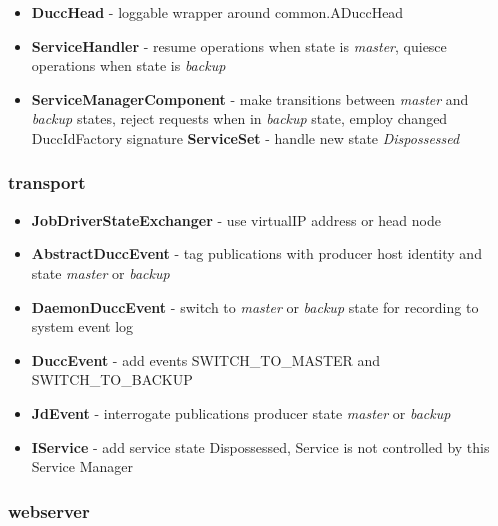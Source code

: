 \documentclass[letterpaper]{article}
\begin{document}
{\renewcommand\labelitemi{}
\begin{itemize}
  \item \textbf{DuccHead} - loggable wrapper around common.ADuccHead
  \item \textbf{ServiceHandler} - resume operations when state is {\em master}, quiesce operations when state is {\em backup}
  \item \textbf{ServiceManagerComponent} - make transitions between {\em master} and {\em backup} states, reject requests when in {\em backup} state, employ changed DuccIdFactory signature 
 \textbf{ServiceSet} - handle new state {\em Dispossessed}
\end{itemize}
}

\subsubsection{transport}

{\renewcommand\labelitemi{}
\begin{itemize}
  \item \textbf{JobDriverStateExchanger} - use virtualIP address or head node
  \item \textbf{AbstractDuccEvent} - tag publications with producer host identity and state {\em master} or {\em backup}
  \item \textbf{DaemonDuccEvent} - switch to {\em master} or {\em backup} state for recording to system event log
  \item \textbf{DuccEvent} - add events SWITCH\_TO\_MASTER and SWITCH\_TO\_BACKUP
  \item \textbf{JdEvent} - interrogate publications producer state {\em master} or {\em backup}
  \item \textbf{IService} - add service state Dispossessed, Service is not controlled by this Service Manager
\end{itemize}
}

\subsubsection{webserver}
\end{document}
